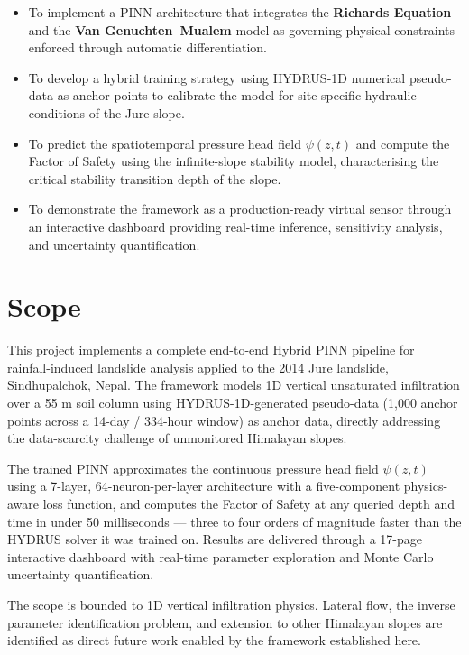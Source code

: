 \documentclass[12pt]{report}
\begin{document}
\begin{itemize}

    \item To implement a PINN architecture that integrates the
    \textbf{Richards Equation} and the \textbf{Van Genuchten--Mualem}
    model as governing physical constraints enforced through automatic
    differentiation.

    \item To develop a hybrid training strategy using HYDRUS-1D
    numerical pseudo-data as anchor points to calibrate the model for
    site-specific hydraulic conditions of the Jure slope.

    \item To predict the spatiotemporal pressure head field
    $\psi(z,t)$ and compute the Factor of Safety using the
    infinite-slope stability model, characterising the critical
    stability transition depth of the slope.

    \item To demonstrate the framework as a production-ready virtual
    sensor through an interactive dashboard providing real-time
    inference, sensitivity analysis, and uncertainty quantification.

\end{itemize}

\section{Scope}

This project implements a complete end-to-end Hybrid PINN pipeline for
rainfall-induced landslide analysis applied to the 2014 Jure landslide,
Sindhupalchok, Nepal. The framework models 1D vertical unsaturated infiltration over a 55 m soil column using HYDRUS-1D-generated pseudo-data (1,000 anchor points across a 14-day / 334-hour window) as anchor data, directly addressing the data-scarcity challenge of unmonitored Himalayan slopes.

The trained PINN approximates the continuous pressure head field
$\psi(z,t)$ using a 7-layer, 64-neuron-per-layer architecture with
a five-component physics-aware loss function, and computes the Factor
of Safety at any queried depth and time in under 50 milliseconds — three
to four orders of magnitude faster than the HYDRUS solver it was trained
on. Results are delivered through a 17-page interactive dashboard with
real-time parameter exploration and Monte Carlo uncertainty
quantification.

The scope is bounded to 1D vertical infiltration physics. Lateral flow,
the inverse parameter identification problem, and extension to other
Himalayan slopes are identified as direct future work enabled by the
framework established here.
\end{document}
